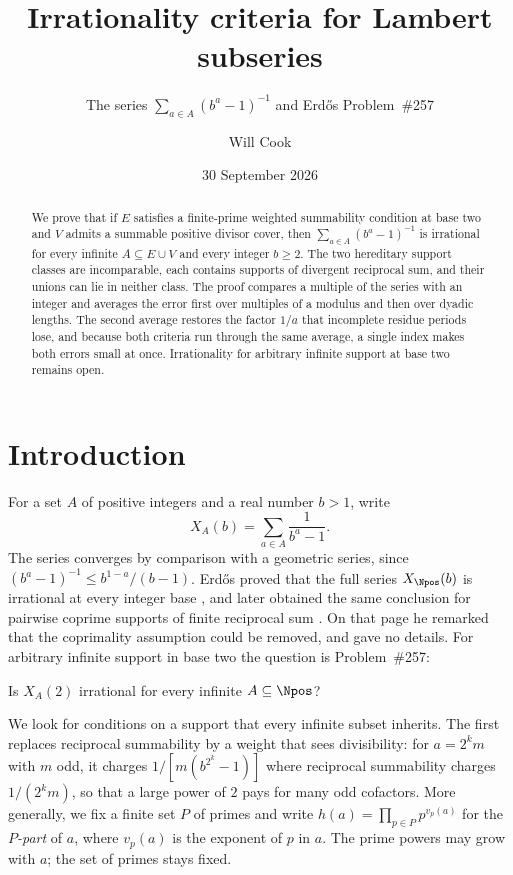 \documentclass[11pt]{article}
\title{Irrationality criteria for Lambert subseries}
\subtitle{The series $\sum_{a\in A}(b^a-1)^{-1}$ and Erd\H{o}s Problem~\#257}
\author{Will Cook}
\date{30 September 2026}
\begin{document}
\maketitle
\noteprovenance
\begin{abstract}
We prove that if $E$ satisfies a finite-prime weighted summability
condition at base two and $V$ admits a summable positive divisor cover,
then $\sum_{a\in A}(b^a-1)^{-1}$ is irrational for every infinite
$A\subseteq E\cup V$ and every integer $b\ge2$. The two hereditary
support classes are incomparable, each contains supports of divergent
reciprocal sum, and their unions can lie in neither class. The proof
compares a multiple of the series with an integer and averages the
error first over multiples of a modulus and then over dyadic lengths.
The second average restores the factor $1/a$ that incomplete residue
periods lose, and because both criteria run through the same average,
a single index makes both errors small at once. Irrationality for
arbitrary infinite support at base two remains open.
\end{abstract}

\section{Introduction}\label{sec:problem}
For a set $A$ of positive integers and a real number $b>1$, write
\[
 X_A(b)=\sum_{a\in A}\frac1{b^a-1}.
\]
The series converges by comparison with a geometric series, since
$(b^a-1)^{-1}\le b^{1-a}/(b-1)$. Erd\H{o}s proved that the full
series $X_{\Npos}(b)$ is irrational at every integer base
\cite{erdos1948}, and later obtained the same conclusion for pairwise
coprime supports of finite reciprocal sum \cite[p.~222]{erdos1968}.
On that page he remarked that the coprimality assumption could be
removed, and gave no details. For arbitrary infinite support in base
two the question is Problem~\#257:

\begin{problem}[Erd\H{o}s \#257]\label{res:problem}
Is $X_A(2)$ irrational for every infinite $A\subseteq\Npos$?
\end{problem}

We look for conditions on a support that every infinite subset
inherits. The first replaces reciprocal summability by a weight that
sees divisibility: for $a=2^km$ with $m$ odd, it charges
$1/[m(b^{2^k}-1)]$ where reciprocal summability charges $1/(2^km)$, so
that a large power of $2$ pays for many odd cofactors. More generally,
we fix a finite set $P$ of primes and write
$h(a)=\prod_{p\in P}p^{v_p(a)}$ for the \emph{$P$-part} of $a$, where
$v_p(a)$ is the exponent of $p$ in $a$. The prime powers may grow with
$a$; the set of primes stays fixed.
\end{document}
